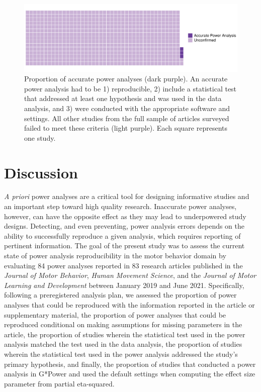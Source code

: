 \documentclass[
  doc, donotrepeattitle,floatsintext]{apa7}
\begin{document}
\clearpage

\begin{figure}

{\centering \includegraphics{../../figs/fig4} 

}

\caption{\normalfont
Proportion of accurate power analyses (dark purple). An accurate power analysis had to be 1) reproducible, 2) include a statistical test that addressed at least one hypothesis and was used in the data analysis, and 3) were conducted with the appropriate software and settings. All other studies from the full sample of articles surveyed failed to meet these criteria (light purple). Each square represents one study.}\label{fig:fig4}
\end{figure}




\clearpage

\hypertarget{discussion}{%
\section{Discussion}\label{discussion}}

\emph{A priori} power analyses are a critical tool for designing informative studies and an important step toward high quality research. Inaccurate power analyses, however, can have the opposite effect as they may lead to underpowered study designs. Detecting, and even preventing, power analysis errors depends on the ability to successfully reproduce a given analysis, which requires reporting of pertinent information. The goal of the present study was to assess the current state of power analysis reproducibility in the motor behavior domain by evaluating 84 power analyses reported in 83 research articles published in the \emph{Journal of Motor Behavior}, \emph{Human Movement Science}, and the \emph{Journal of Motor Learning and Development} between January 2019 and June 2021. Specifically, following a preregistered analysis plan, we assessed the proportion of power analyses that could be reproduced with the information reported in the article or supplementary material, the proportion of power analyses that could be reproduced conditional on making assumptions for missing parameters in the article, the proportion of studies wherein the statistical test used in the power analysis matched the test used in the data analysis, the proportion of studies wherein the statistical test used in the power analysis addressed the study's primary hypothesis, and finally, the proportion of studies that conducted a power analysis in G*Power and used the default settings when computing the effect size parameter from partial eta-squared.
\end{document}
